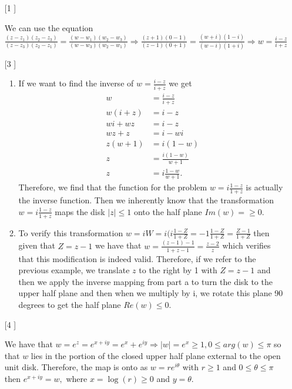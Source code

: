 \documentclass{article}
\theoremstyle{definition}
\begin{document}
\begin{enumerate}
    \item [[\phantom{-}1]]

    We can use the equation $\frac{(z - z_1)(z_2 - z_3)}{(z - z_3)(z_2 - z_1)} = \frac{(w - w_1)(w_2 - w_3)}{(w - w_3)(w_2 - w_1)} \Rightarrow \frac{(z + 1)(0 - 1)}{(z - 1)(0 + 1)} = \frac{(w + i)(1 - i)}{(w - i)(1 + i)} \Rightarrow w = \frac{i - z}{i + z}$

    \item [[\phantom{-}3]]

    \begin{enumerate}
        \item

        If we want to find the inverse of $w = \frac{i - z}{i + z}$ we get
        \begin{align*}
        w &= \frac{i - z}{i + z}\\
        w(i + z) &= i - z\\
        wi + wz &= i - z\\
        wz + z &= i - wi\\
        z(w + 1) &= i(1 - w)\\
        z &= \frac{i(1 - w)}{w + 1}\\
        z &= i\frac{1 - w}{w + 1}.
        \end{align*} Therefore, we find that the function for the problem $w = i\frac{1-z}{1 + z}$ is actually the inverse function. Then we inherently know that the transformation $w = i\frac{1 - z}{1 + z}$ maps the disk $|z| \leq 1$ onto the half plane $Im(w) = \geq 0.$

        \item

        To verify this transformation $w = iW = i(i\frac{1 - Z}{1 + Z} = -1\frac{1 - Z}{1 + Z} = \frac{Z - 1}{1 + Z}$ then given that $Z = z - 1$ we have that $w = \frac{(z - 1) - 1}{1 + z - 1} = \frac{z - 2}{z}$ which verifies that this modification is indeed valid. Therefore, if we refer to the previous example, we translate $z$ to the right by 1 with $Z = z - 1$ and then we apply the inverse mapping from part a to turn the disk to the upper half plane and then when we multiply by i, we rotate this plane 90 degrees to get the half plane $Re (w) \leq 0.$
        
    \end{enumerate}

    \item [[\phantom{-}4]]

    We have that $w = e^z = e^{x + iy} = e^x + e^{iy} \Rightarrow |w| = e^x \geq 1, 0 \leq arg(w) \leq \pi$ so that $w$ lies in the portion of the closed upper half plane external to the open unit disk. Therefore, the map is onto as $w = re^{i\theta}$ with $r \geq 1$ and $0\leq \theta \leq \pi$ then $e^{x + iy} = w, $ where $x = \log(r) \geq 0$ and $y = \theta$.


\end{enumerate}
\end{document}
